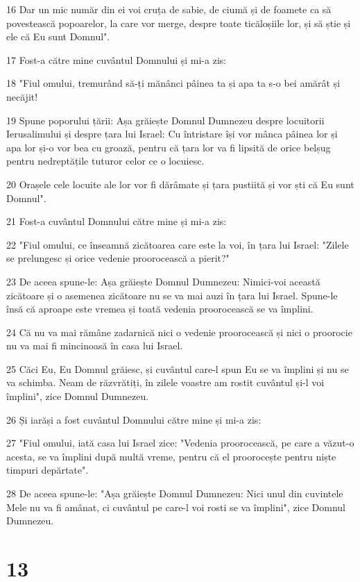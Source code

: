 \par 16 Dar un mic număr din ei voi cruța de sabie, de ciumă și de foamete ca să povestească popoarelor, la care vor merge, despre toate ticăloșiile lor, și să știe și ele că Eu sunt Domnul".
\par 17 Fost-a către mine cuvântul Domnului și mi-a zis:
\par 18 "Fiul omului, tremurând să-ți mănânci pâinea ta și apa ta s-o bei amărât și necăjit!
\par 19 Spune poporului țării: Așa grăiește Domnul Dumnezeu despre locuitorii Ierusalimului și despre țara lui Israel: Cu întristare își vor mânca pâinea lor și apa lor și-o vor bea cu groază, pentru că țara lor va fi lipsită de orice belșug pentru nedreptățile tuturor celor ce o locuiesc.
\par 20 Orașele cele locuite ale lor vor fi dărâmate și țara pustiită și vor ști că Eu sunt Domnul".
\par 21 Fost-a cuvântul Domnului către mine și mi-a zis:
\par 22 "Fiul omului, ce înseamnă zicătoarea care este la voi, în țara lui Israel: "Zilele se prelungesc și orice vedenie proorocească a pierit?"
\par 23 De aceea spune-le: Așa grăiește Domnul Dumnezeu: Nimici-voi această zicătoare și o asemenea zicătoare nu se va mai auzi în țara lui Israel. Spune-le însă că aproape este vremea și toată vedenia proorocească se va împlini.
\par 24 Că nu va mai rămâne zadarnică nici o vedenie proorocească și nici o proorocie nu va mai fi mincinoasă în casa lui Israel.
\par 25 Căci Eu, Eu Domnul grăiesc, și cuvântul care-l spun Eu se va împlini și nu se va schimba. Neam de răzvrătiți, în zilele voastre am rostit cuvântul și-l voi împlini", zice Domnul Dumnezeu.
\par 26 Și iarăși a fost cuvântul Domnului către mine și mi-a zis:
\par 27 "Fiul omului, iată casa lui Israel zice: "Vedenia proorocească, pe care a văzut-o acesta, se va împlini după multă vreme, pentru că el proorocește pentru niște timpuri depărtate".
\par 28 De aceea spune-le: "Așa grăiește Domnul Dumnezeu: Nici unul din cuvintele Mele nu va fi amânat, ci cuvântul pe care-l voi rosti se va împlini", zice Domnul Dumnezeu.

\chapter{13}

